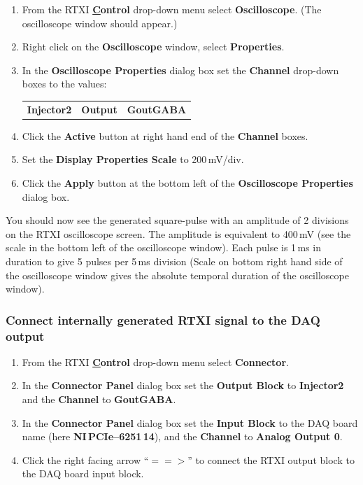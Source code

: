 \documentclass[12pt]{article}
\begin{document}
\begin{enumerate}
	\item From the RTXI {\bf \underline Control} drop-down menu select {\bf Oscilloscope}. (The oscilloscope 
		window should appear.)
	\item Right click on the {\bf Oscilloscope} window, select {\bf Properties}.
	\item In the {\bf Oscilloscope Properties} dialog box set the {\bf Channel} drop-down boxes to the values:
		\begin{tabular}{ l c r }
			 {\bf Injector2} & {\bf Output} & {\bf GoutGABA}
		 \end{tabular}
	\item Click the {\bf Active} button at right hand end of the {\bf Channel} boxes.
 	\item Set the {\bf Display Properties Scale} to 200\,mV/div.
 \item Click the {\bf Apply} button at the bottom left of the {\bf Oscilloscope Properties} dialog box.

\end{enumerate}
You should now see the generated square-pulse  with an amplitude of 2 divisions on the RTXI oscilloscope screen. The amplitude is equivalent to 400\,mV (see the scale in the bottom left of the oscilloscope window). Each pulse is 1\,ms in duration to give 5 pulses per 5\,ms division (Scale on bottom right hand side of the oscilloscope window gives the absolute temporal duration of the oscilloscope window).

\subsubsection*{Connect internally generated RTXI signal to the DAQ output}

\begin{enumerate}
	\item From the RTXI {\bf \underline Control} drop-down menu select {\bf Connector}.
	\item In the {\bf Connector Panel} dialog box set the {\bf Output Block} to {\bf Injector2} and the {\bf 
		Channel} to {\bf GoutGABA}.
	\item In the {\bf Connector Panel} dialog box set the {\bf Input Block} to the DAQ board name (here 
		{\bf NI\,PCIe--6251\,14}), and the {\bf Channel} to {\bf Analog Output 0}.
	\item Click the right facing arrow ``$==>$'' to connect the RTXI output block to the DAQ board input 
		block.
\end{enumerate}
\end{document}
